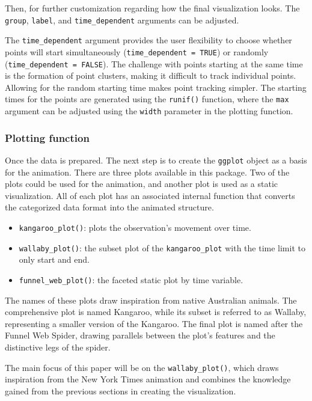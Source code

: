 Then, for further customization regarding how the final visualization looks. The \texttt{group}, \texttt{label}, and \texttt{time\_dependent} arguments can be adjusted.

The \texttt{time\_dependent} argument provides the user flexibility to choose whether points will start simultaneously (\texttt{time\_dependent\ =\ TRUE}) or randomly (\texttt{time\_dependent\ =\ FALSE}). The challenge with points starting at the same time is the formation of point clusters, making it difficult to track individual points. Allowing for the random starting time makes point tracking simpler. The starting times for the points are generated using the \texttt{runif()} function, where the \texttt{max} argument can be adjusted using the \texttt{width} parameter in the plotting function.

\hypertarget{plotting-function}{%
\subsubsection{Plotting function}\label{plotting-function}}

Once the data is prepared. The next step is to create the \texttt{ggplot} object as a basis for the animation. There are three plots available in this package. Two of the plots could be used for the animation, and another plot is used as a static visualization. All of each plot has an associated internal function that converts the categorized data format into the animated structure.

\begin{itemize}
\tightlist
\item
  \texttt{kangaroo\_plot()}: plots the observation's movement over time.
\item
  \texttt{wallaby\_plot()}: the subset plot of the \texttt{kangaroo\_plot} with the time limit to only start and end.
\item
  \texttt{funnel\_web\_plot()}: the faceted static plot by time variable.
\end{itemize}

The names of these plots draw inspiration from native Australian animals. The comprehensive plot is named Kangaroo, while its subset is referred to as Wallaby, representing a smaller version of the Kangaroo. The final plot is named after the Funnel Web Spider, drawing parallels between the plot's features and the distinctive legs of the spider.

The main focus of this paper will be on the \texttt{wallaby\_plot()}, which draws inspiration from the New York Times animation and combines the knowledge gained from the previous sections in creating the visualization.

